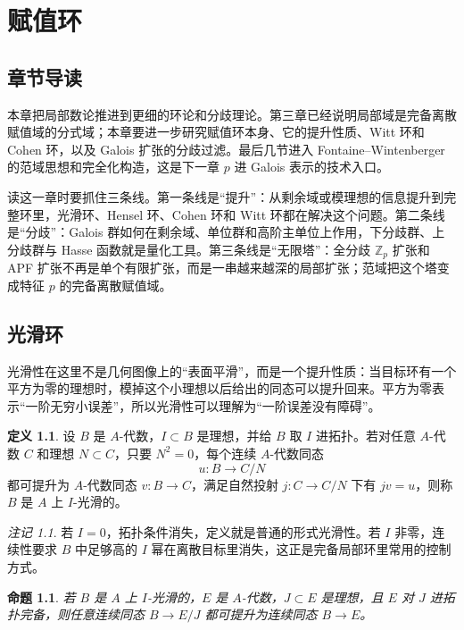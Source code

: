 \documentclass[11pt,a4paper,openany]{ctexbook}
\numberwithin{equation}{chapter}
\newcommand{\Z}{\mathbb{Z}}
\theoremstyle{plain}
\newtheorem{proposition}[theorem]{命题}
\theoremstyle{definition}
\newtheorem{definition}[theorem]{定义}
\theoremstyle{remark}
\newtheorem{remark}[theorem]{注记}
\begin{document}
 \chapter{赋值环}

\section{章节导读}

本章把局部数论推进到更细的环论和分歧理论。第三章已经说明局部域是完备离散赋值域的分式域；本章要进一步研究赋值环本身、它的提升性质、Witt 环和 Cohen 环，以及 Galois 扩张的分歧过滤。最后几节进入 Fontaine--Wintenberger 的范域思想和完全化构造，这是下一章 $p$ 进 Galois 表示的技术入口。

读这一章时要抓住三条线。第一条线是“提升”：从剩余域或模理想的信息提升到完整环里，光滑环、Hensel 环、Cohen 环和 Witt 环都在解决这个问题。第二条线是“分歧”：Galois 群如何在剩余域、单位群和高阶主单位上作用，下分歧群、上分歧群与 Hasse 函数就是量化工具。第三条线是“无限塔”：全分歧 $\Z_p$ 扩张和 APF 扩张不再是单个有限扩张，而是一串越来越深的局部扩张；范域把这个塔变成特征 $p$ 的完备离散赋值域。

\section{光滑环}

光滑性在这里不是几何图像上的“表面平滑”，而是一个提升性质：当目标环有一个平方为零的理想时，模掉这个小理想以后给出的同态可以提升回来。平方为零表示“一阶无穷小误差”，所以光滑性可以理解为“一阶误差没有障碍”。

\begin{definition}
设 $B$ 是 $A$-代数，$I\subset B$ 是理想，并给 $B$ 取 $I$ 进拓扑。若对任意 $A$-代数 $C$ 和理想 $N\subset C$，只要 $N^2=0$，每个连续 $A$-代数同态
\[
  u:B\longrightarrow C/N
\]
都可提升为 $A$-代数同态 $v:B\to C$，满足自然投射 $j:C\to C/N$ 下有 $jv=u$，则称 $B$ 是 $A$ 上 $I$-光滑的。
\end{definition}

\begin{remark}
若 $I=0$，拓扑条件消失，定义就是普通的形式光滑性。若 $I$ 非零，连续性要求 $B$ 中足够高的 $I$ 幂在离散目标里消失，这正是完备局部环里常用的控制方式。
\end{remark}

\begin{proposition}
若 $B$ 是 $A$ 上 $I$-光滑的，$E$ 是 $A$-代数，$J\subset E$ 是理想，且 $E$ 对 $J$ 进拓扑完备，则任意连续同态 $B\to E/J$ 都可提升为连续同态 $B\to E$。
\end{proposition}
\end{document}
